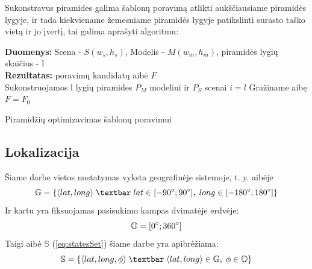\documentclass[a4paper,12pt]{article}
\renewcommand{\KwData}{\textbf{Duomenys:}}
\renewcommand{\KwResult}{\textbf{Rezultatas:}}
\begin{document}
			Sukonstravus piramides galima šablonų poravimą atlikti aukščiausiame piramidės lygyje, ir tada kiekviename žemesniame piramidės lygyje patikslinti surasto taško vietą ir jo įvertį, tai galima aprašyti algoritmu: 
			
			\begin{algorithm}[H]
				\SetNlSty{}{}{:}
				\LinesNotNumbered
				\KwData{ Scena - $S(w_s,h_s)$, Modelis - $M(w_m,h_m)$, piramidės lygių skaičius - l \\}
				\KwResult{ poravimų kandidatų aibė $F$ \\}		
				Sukonstruojamos l lygių piramides $P_M$ modeliui ir $P_S$ scenai\;
				$i = l$\;
				Gražiname aibę $F = F_0$
				\caption{Piramidžių optimizavimas šablonų poravimui}
			\end{algorithm}			
			
		\subsection{Lokalizacija}
	
			Šiame darbe vietos nustatymas vyksta geografinėje sistemoje, t. y. aibėje
			\begin{equation}
				\mathbb{G} = \left\{ \langle lat, long \rangle  \;\textbar\; lat \in [-90\degree;90\degree],\; long \in [-180\degree;180\degree] \right\}
			\end{equation}
			Ir kartu yra fiksuojamas pasisukimo kampas dvimatėje erdvėje:
			\begin{equation}
				\mathbb{O} = [0\degree; 360\degree]
			\end{equation}			
			Taigi aibė $\mathbb{S}$ (\ref{eq:statesSet}) šiame darbe yra apibrėžiama:
			\begin{equation}
				\mathbb{S} = \left\{ \langle lat, long, \phi \rangle \;\textbar\;  \langle lat, long \rangle \in \mathbb{G}, \;  \phi \in \mathbb{O} \right\}
			\end{equation}
			
\end{document}
